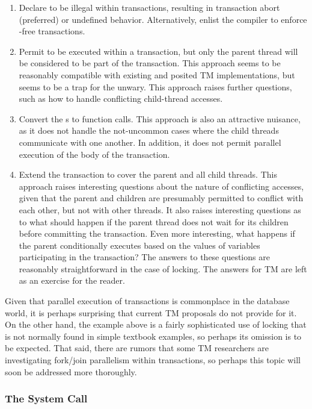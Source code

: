 \begin{enumerate}
\item	Declare  to be illegal within transactions,
	resulting in transaction abort (preferred) or undefined
	behavior. Alternatively, enlist the compiler to enforce
	-free transactions.
\item	Permit  to be executed within a
	transaction, but only the parent thread will be considered to
	be part of the transaction.
	This approach seems to be reasonably compatible with existing and
	posited TM implementations, but seems to be a trap for the unwary.
	This approach raises further questions, such as how to handle
	conflicting child-thread accesses.
\item	Convert the s to function calls.
	This approach is also an attractive nuisance, as it does not
	handle the not-uncommon cases where the child threads communicate
	with one another.
	In addition, it does not permit parallel execution of the body
	of the transaction.
\item	Extend the transaction to cover the parent and all child threads.
	This approach raises interesting questions about the nature of
	conflicting accesses, given that the parent and children are
	presumably permitted to conflict with each other, but not with
	other threads.
	It also raises interesting questions as to what should happen
	if the parent thread does not wait for its children before
	committing the transaction.
	Even more interesting, what happens if the parent conditionally
	executes  based on the values of variables
	participating in the transaction?
	The answers to these questions are reasonably straightforward
	in the case of locking.
	The answers for TM are left as an exercise for the reader.
\end{enumerate}

Given that parallel execution of transactions is commonplace in the
database world, it is perhaps surprising that current TM proposals do
not provide for it.
On the other hand, the example above is a fairly sophisticated use
of locking that is not normally found in simple textbook examples,
so perhaps its omission is to be expected.
That said, there are rumors that some TM researchers are investigating
fork/join parallelism within transactions, so perhaps this topic will
soon be addressed more thoroughly.

\subsubsection{The  System Call}
\label{sec:future:The exec System Call}

